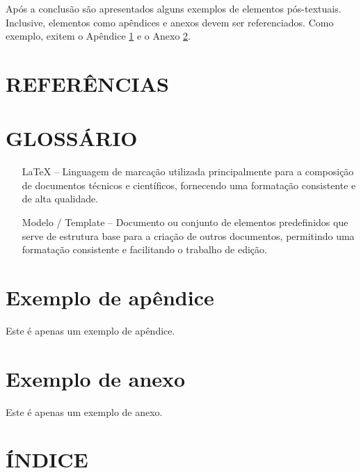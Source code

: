 \documentclass{iftex2024}
\begin{document}
Após a conclusão são apresentados alguns exemplos de elementos pós-textuais.
Inclusive, elementos como apêndices e anexos devem ser referenciados.
Como exemplo, exitem o Apêndice \ref{ap:exemplo} e o Anexo \ref{an:exemplo}.

\chapter*{REFERÊNCIAS}

\printbibliography

\chapter*{GLOSSÁRIO}

\begin{itemize}[]
\item[LaTeX] -- Linguagem de marcação utilizada principalmente para a composição de documentos técnicos e científicos, fornecendo uma formatação consistente e de alta qualidade.
\item[Modelo / Template] -- Documento ou conjunto de elementos predefinidos que serve de estrutura base para a criação de outros documentos, permitindo uma formatação consistente e facilitando o trabalho de edição.
\end{itemize}

\appendix

\chapter{Exemplo de apêndice} \label{ap:exemplo}

Este é apenas um exemplo de apêndice.

\attachment

\chapter{Exemplo de anexo} \label{an:exemplo}

Este é apenas um exemplo de anexo.

\chapter*{ÍNDICE}

\printindex
\end{document}
